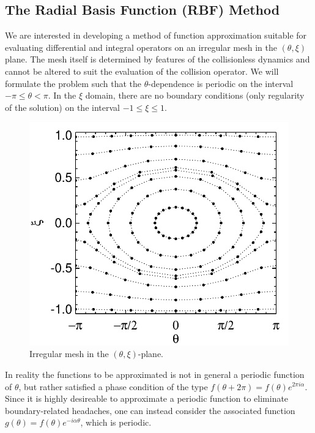 \subsection{The Radial Basis Function (RBF) Method}

We are interested in developing a method of function approximation 
suitable for evaluating differential and integral operators on 
an irregular mesh in the $(\theta,\xi)$ plane.  The mesh itself
is determined by features of the collisionless dynamics and 
cannot be altered to suit the evaluation of the collision 
operator.  We will formulate the problem such that the 
$\theta$-dependence is periodic on the interval $-\pi \le \theta < \pi$.
In the $\xi$ domain, there are no boundary conditions (only
regularity of the solution) on the interval $-1 \le \xi \le 1$. 

\begin{figure}[h]
\begin{center}
\includegraphics[scale=0.7]{figures/stencil.pdf}
\caption{Irregular mesh in the $(\theta,\xi)$-plane.}
\label{fig.stencil}
\end{center}
\end{figure}

In reality the functions to be approximated is not in general
a periodic function of $\theta$, but rather satisfied a phase 
condition of the type $f(\theta+2\pi) = f(\theta) e^{2\pi i \alpha}$.
Since it is highly desireable to approximate a periodic 
function to eliminate boundary-related headaches, one can 
instead consider the associated function 
$g(\theta) = f(\theta) e^{-i \alpha  \theta}$, which is periodic.
 
